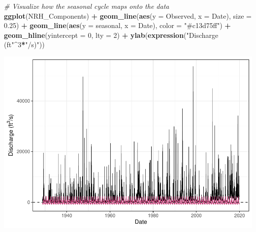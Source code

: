 \documentclass[12pt,]{article}
\newenvironment{Shaded}{\begin{snugshade}}{\end{snugshade}}
\newcommand{\CommentTok}[1]{\textcolor[rgb]{0.56,0.35,0.01}{\textit{#1}}}
\newcommand{\DataTypeTok}[1]{\textcolor[rgb]{0.13,0.29,0.53}{#1}}
\newcommand{\DecValTok}[1]{\textcolor[rgb]{0.00,0.00,0.81}{#1}}
\newcommand{\FloatTok}[1]{\textcolor[rgb]{0.00,0.00,0.81}{#1}}
\newcommand{\KeywordTok}[1]{\textcolor[rgb]{0.13,0.29,0.53}{\textbf{#1}}}
\newcommand{\NormalTok}[1]{#1}
\newcommand{\OperatorTok}[1]{\textcolor[rgb]{0.81,0.36,0.00}{\textbf{#1}}}
\newcommand{\StringTok}[1]{\textcolor[rgb]{0.31,0.60,0.02}{#1}}
\begin{document}
\begin{Shaded}
\begin{Highlighting}[]
\CommentTok{# Visualize how the seasonal cycle maps onto the data}
\KeywordTok{ggplot}\NormalTok{(NRH_Components) }\OperatorTok{+}
\StringTok{  }\KeywordTok{geom_line}\NormalTok{(}\KeywordTok{aes}\NormalTok{(}\DataTypeTok{y =}\NormalTok{ Observed, }\DataTypeTok{x =}\NormalTok{ Date),  }\DataTypeTok{size =} \FloatTok{0.25}\NormalTok{) }\OperatorTok{+}
\StringTok{  }\KeywordTok{geom_line}\NormalTok{(}\KeywordTok{aes}\NormalTok{(}\DataTypeTok{y =}\NormalTok{ seasonal, }\DataTypeTok{x =}\NormalTok{ Date), }\DataTypeTok{color =} \StringTok{"#c13d75ff"}\NormalTok{) }\OperatorTok{+}
\StringTok{  }\KeywordTok{geom_hline}\NormalTok{(}\DataTypeTok{yintercept =} \DecValTok{0}\NormalTok{, }\DataTypeTok{lty =} \DecValTok{2}\NormalTok{) }\OperatorTok{+}
\StringTok{  }\KeywordTok{ylab}\NormalTok{(}\KeywordTok{expression}\NormalTok{(}\StringTok{"Discharge (ft"}\OperatorTok{^}\DecValTok{3}\OperatorTok{*}\StringTok{"/s)"}\NormalTok{))}
\end{Highlighting}
\end{Shaded}

\includegraphics{Project_Template_files/figure-latex/unnamed-chunk-6-4.pdf}

\begin{Shaded}
\end{Shaded}
\end{document}
